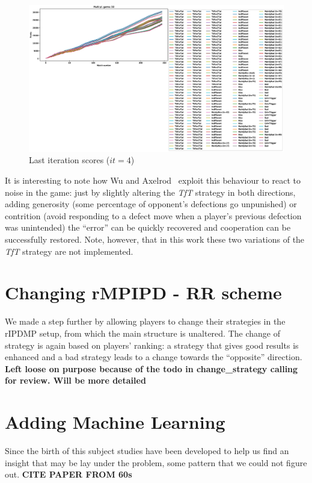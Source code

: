 \documentclass[journal,a4paper,10pt,twoside]{IEEEtran} %
\begin{document}
\begin{figure}[!ht]
    \centering
    \includegraphics[width=1\columnwidth]{../img/ripdmp-incr/ripdmp-scores-increasing-pop-50-r4}
    \caption{Last iteration scores ($it=4$)}
    \label{fig:incrLI}
\end{figure}

It is interesting to note how Wu and Axelrod~\cite{IPDnoise} exploit this behaviour to react to noise in the game: just by slightly altering the \textit{TfT} strategy in both directions, adding generosity (some percentage of opponent's defections go unpunished) or contrition (avoid responding to a defect move when a player's previous defection was unintended) the ``error'' can be quickly recovered and cooperation can be successfully restored. Note, however, that in this work these two variations of the \textit{TfT} strategy are not implemented.

\section{Changing rMPIPD - RR scheme} \label{s:crIPDMP}
We made a step further by allowing players to change their strategies in the rIPDMP setup, from which the main structure is unaltered. The change of strategy is again based on players' ranking: a strategy that gives good results is enhanced and a bad strategy leads to a change towards the ``opposite'' direction.
\textbf{Left loose on purpose because of the todo in change_strategy calling for review. Will be more detailed}

\section{Adding Machine Learning} \label{s:ml}
Since the birth of this subject studies have been developed to help us find an insight that may be lay under the problem, some pattern that we could not figure out. \textbf{CITE PAPER FROM 60s}
\end{document}
